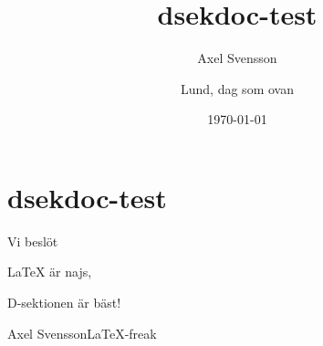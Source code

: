 \documentclass{dsekdoc}
\date{\today}
\title{\textsf{dsekdoc}-test}
\author{Axel Svensson}
\begin{document}
\maketitle
\section*{\textsf{dsekdoc}-test}
\lipsum[1-2]

Vi beslöt
\begin{attlist}
\item \LaTeX{} är najs,
\item \lipsum[4]
\item D-sektionen är bäst!
\end{attlist}

\lipsum[5-7]

\signature{Lund, dag som ovan}{Axel Svensson}{\LaTeX-freak}
\end{document}
